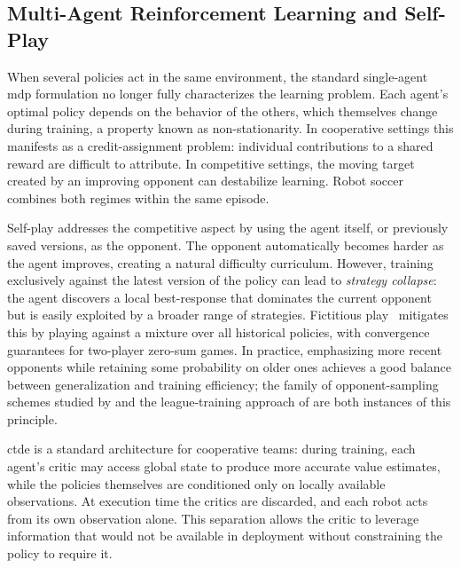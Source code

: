 \subsection{Multi-Agent Reinforcement Learning and Self-Play}

When several policies act in the same environment, the standard single-agent
\gls{mdp} formulation no longer fully characterizes the learning problem.  Each
agent's optimal policy depends on the behavior of the others, which themselves
change during training, a property known as non-stationarity.  In cooperative
settings this manifests as a credit-assignment problem: individual contributions
to a shared reward are difficult to attribute.  In competitive settings, the
moving target created by an improving opponent can destabilize learning.  Robot
soccer combines both regimes within the same episode.

Self-play addresses the competitive aspect by using the agent itself, or
previously saved versions, as the opponent.  The opponent automatically
becomes harder as the agent improves, creating a natural difficulty curriculum.
However, training exclusively against the latest version of the policy can lead
to \emph{strategy collapse}: the agent discovers a local best-response that
dominates the current opponent but is easily exploited by a broader range of
strategies.  Fictitious play~\cite{brown1951fp} mitigates this by playing
against a mixture over all historical policies, with convergence guarantees for
two-player zero-sum games.  In practice, emphasizing more recent opponents
while retaining some probability on older ones achieves a good balance between
generalization and training efficiency; the family of opponent-sampling
schemes studied by \textcite{master_thay} and the league-training approach of
\textcite{starcraft_marl} are both instances of this principle.

\gls{ctde} is a standard architecture for cooperative teams: during training,
each agent's critic may access global state to produce more accurate value
estimates, while the policies themselves are conditioned only on locally
available observations.  At execution time the critics are discarded, and each
robot acts from its own observation alone.  This separation allows the critic
to leverage information that would not be available in deployment without
constraining the policy to require it.

